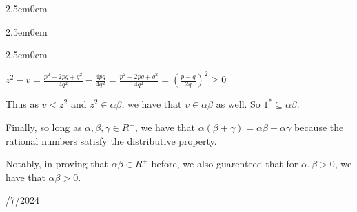 \documentclass{book}
\newenvironment{myIndent}{%
   \begin{adjustwidth}{2.5em}{0em}%
}{%
   \end{adjustwidth}%
}
\newcommand{\retTwo}{\hfill\bigbreak}
\newcommand{\dispDate}[1]{{
   \color{Black}%
   \fontsize{20}{18}\selectfont%
   #1\retTwo
}}
\begin{document}
\begin{myIndent}
\begin{myIndent}
\begin{myIndent}
            \begin{centering}
               $z^2 - v = \frac{p^2 + 2pq + q^2}{4q^2} - \frac{4pq}{4q^2} = \frac{p^2 - 2pq + q^2}{4q^2} = \left(\frac{p - q}{2q}\right)^2 \geq 0$\retTwo\par
            \end{centering}

            Thus as $v < z^2$ and $z^2 \in \alpha\beta$, we have that $v \in \alpha\beta$ as well. So $1^* \subseteq \alpha\beta$.\newpage
         \end{myIndent}

         Finally, so long as $\alpha, \beta, \gamma \in R^+$, we have that  $\alpha(\beta + \gamma) = \alpha\beta + \alpha\gamma$ because the rational numbers satisfy the distributive property.\retTwo
      \end{myIndent}

      Notably, in proving that $\alpha\beta \in R^+$ before, we also guarenteed that for $\alpha, \beta > 0$, we have that $\alpha\beta > 0$.\retTwo
   \end{myIndent} 

   \dispDate{9/7/2024}
\end{document}
